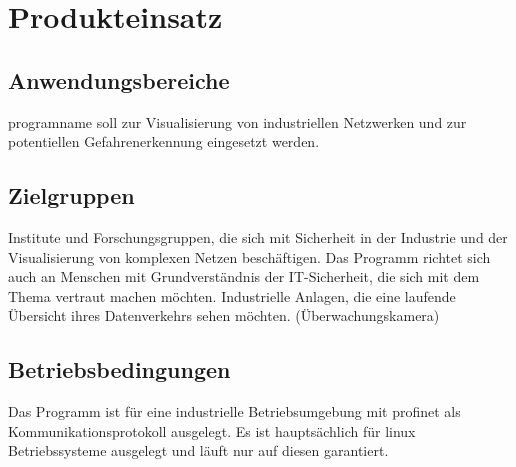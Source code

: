 \chapter{Produkteinsatz}

\section{Anwendungsbereiche}
\gls{programname} soll zur Visualisierung von industriellen Netzwerken und zur potentiellen Gefahrenerkennung eingesetzt werden.

\section{Zielgruppen}
Institute und Forschungsgruppen, die sich mit Sicherheit in der Industrie und der Visualisierung von komplexen Netzen beschäftigen. Das Programm richtet sich auch an Menschen mit Grundverständnis der IT-Sicherheit, die sich mit dem Thema vertraut machen möchten.\newline\newline
Industrielle Anlagen, die eine laufende Übersicht ihres Datenverkehrs sehen möchten. (Überwachungskamera)

\section{Betriebsbedingungen}
Das Programm ist für eine industrielle Betriebsumgebung mit \gls{profinet} als Kommunikationsprotokoll ausgelegt. Es ist hauptsächlich für \gls{linux} Betriebssysteme ausgelegt und läuft nur auf diesen garantiert.
